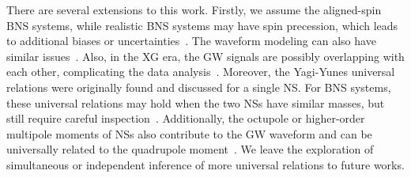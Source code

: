 \documentclass[a4paper,11pt]{article}
\begin{document}
There are several extensions to this work. Firstly, we assume the aligned-spin BNS systems, while
realistic BNS systems may have spin precession, which leads to additional
biases or uncertainties~\cite{Williamson:2017evr}. The waveform modeling can
also have similar issues~\cite{Purrer:2019jcp,Gamba:2020wgg}. 
Also, in the XG era, the GW signals are possibly overlapping with each
other, complicating the data analysis~\cite{Pizzati:2021apa, Samajdar:2021egv,
Wang:2023ldq, Johnson:2024foj, Wang:2025ckw}.
Moreover, the Yagi-Yunes universal relations were originally found and discussed
for a single NS. For BNS systems, these universal relations may hold when the
two NSs have similar masses, but still require careful
inspection~\cite{Shao:2022koz, Saffer:2021gak}. Additionally, the octupole or
higher-order multipole moments of NSs also contribute to the GW waveform and can
be universally related to the quadrupole moment~\cite{Yagi_2017,Abac:2023ujg}.
We leave the exploration of simultaneous or independent inference of more
universal relations to future works.

\acknowledgments

\clearpage


% 

\end{document}
